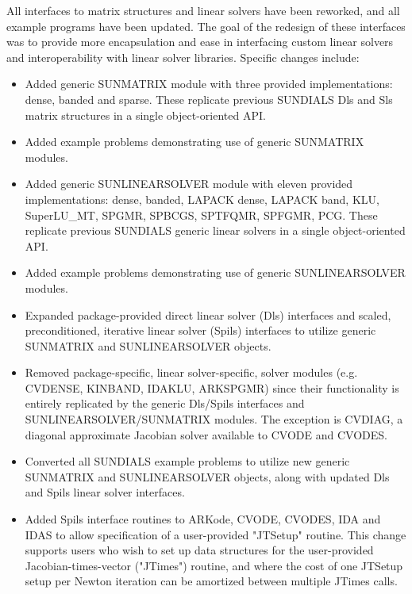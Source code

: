 All interfaces to matrix structures and linear solvers
have been reworked, and all example programs have been updated.
The goal of the redesign of these interfaces was to provide more encapsulation
and ease in interfacing custom linear solvers and interoperability
with linear solver libraries.
Specific changes include:
\begin{itemize}
\item Added generic SUNMATRIX module with three provided implementations:
        dense, banded and sparse.  These replicate previous SUNDIALS Dls and
        Sls matrix structures in a single object-oriented API.
\item Added example problems demonstrating use of generic SUNMATRIX modules.
\item Added generic SUNLINEARSOLVER module with eleven provided
        implementations: dense, banded, LAPACK dense, LAPACK band, KLU,
        SuperLU\_MT, SPGMR, SPBCGS, SPTFQMR, SPFGMR, PCG.  These replicate
        previous SUNDIALS generic linear solvers in a single object-oriented
        API.
\item Added example problems demonstrating use of generic SUNLINEARSOLVER
        modules.
\item Expanded package-provided direct linear solver (Dls) interfaces and
        scaled, preconditioned, iterative linear solver (Spils) interfaces
        to utilize generic SUNMATRIX and SUNLINEARSOLVER objects.
\item Removed package-specific, linear solver-specific, solver modules
        (e.g. CVDENSE, KINBAND, IDAKLU, ARKSPGMR) since their functionality
        is entirely replicated by the generic Dls/Spils interfaces and
        SUNLINEARSOLVER/SUNMATRIX modules.  The exception is CVDIAG, a
        diagonal approximate Jacobian solver available to CVODE and CVODES.
\item Converted all SUNDIALS example problems to utilize new generic
        SUNMATRIX and SUNLINEARSOLVER objects, along with updated Dls and
        Spils linear solver interfaces.
\item Added Spils interface routines to ARKode, CVODE, CVODES, IDA and
        IDAS to allow specification of a user-provided "JTSetup" routine.
        This change supports users who wish to set up data structures for
        the user-provided Jacobian-times-vector ("JTimes") routine, and
        where the cost of one JTSetup setup per Newton iteration can be
        amortized between multiple JTimes calls.
\end{itemize}


